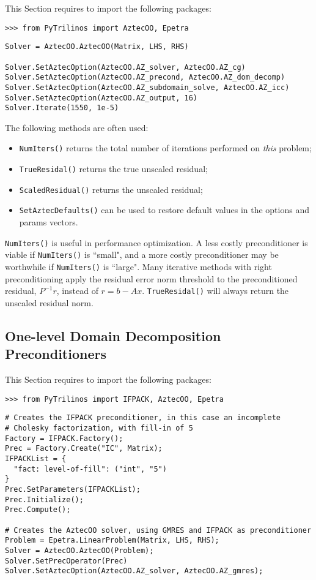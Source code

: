\documentclass[10pt,relax]{SANDreport}
\begin{document}
This Section requires to import the following packages:
\begin{verbatim}
>>> from PyTrilinos import AztecOO, Epetra
\end{verbatim}


\begin{verbatim}
Solver = AztecOO.AztecOO(Matrix, LHS, RHS)

Solver.SetAztecOption(AztecOO.AZ_solver, AztecOO.AZ_cg)
Solver.SetAztecOption(AztecOO.AZ_precond, AztecOO.AZ_dom_decomp)
Solver.SetAztecOption(AztecOO.AZ_subdomain_solve, AztecOO.AZ_icc)
Solver.SetAztecOption(AztecOO.AZ_output, 16)
Solver.Iterate(1550, 1e-5)
\end{verbatim}

The following methods are often used:
\begin{itemize}
\item \verb!NumIters()! returns the total number of iterations performed
  on {\sl this} problem;
\item \verb!TrueResidal()! returns the true unscaled residual;
\item \verb!ScaledResidual()! returns the unscaled residual;
\item \verb!SetAztecDefaults()! can be used to restore default values in
  the options and params vectors.
\end{itemize}
\verb!NumIters()! is useful in performance optimization.
A less costly preconditioner is viable if \verb!NumIters()! is ``small",
and a more costly preconditioner may be worthwhile if \verb!NumIters()! is ``large".
Many iterative methods with right preconditioning
apply the residual error norm threshold to the preconditioned residual,
$P^{-1}r$, instead of $r=b-Ax$.
\verb!TrueResidal()! will always return the unscaled residual norm.

\subsection{One-level Domain Decomposition Preconditioners}
\label{sec:dd}

This Section requires to import the following packages:
\begin{verbatim}
>>> from PyTrilinos import IFPACK, AztecOO, Epetra
\end{verbatim}

\begin{verbatim}
# Creates the IFPACK preconditioner, in this case an incomplete
# Cholesky factorization, with fill-in of 5
Factory = IFPACK.Factory();
Prec = Factory.Create("IC", Matrix);
IFPACKList = {
  "fact: level-of-fill": ("int", "5")
}
Prec.SetParameters(IFPACKList);
Prec.Initialize();
Prec.Compute();

# Creates the AztecOO solver, using GMRES and IFPACK as preconditioner
Problem = Epetra.LinearProblem(Matrix, LHS, RHS);
Solver = AztecOO.AztecOO(Problem);
Solver.SetPrecOperator(Prec)
Solver.SetAztecOption(AztecOO.AZ_solver, AztecOO.AZ_gmres);
\end{verbatim}
\end{document}
